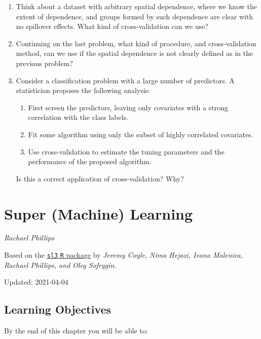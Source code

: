\documentclass[12pt, krantz2,]{book}
\providecommand{\tightlist}{%
  \setlength{\itemsep}{0pt}\setlength{\parskip}{0pt}}
\theoremstyle{definition}
\theoremstyle{definition}
\theoremstyle{definition}
\newcommand{\1}{\mathbbm{1}}
\begin{document}
\begin{enumerate}
\def\labelenumi{\arabic{enumi}.}
\item
  Think about a dataset with arbitrary spatial dependence, where we know
  the extent of dependence, and groups formed by such dependence are clear
  with no spillover effects. What kind of cross-validation can we use?
\item
  Continuing on the last problem, what kind of procedure, and cross-validation
  method, can we use if the spatial dependence is not clearly defined as in the
  previous problem?
\item
  Consider a classification problem with a large number of predictors. A
  statistician proposes the following analysis:

  \begin{enumerate}
  \def\labelenumii{\alph{enumii}.}
  \tightlist
  \item
    First screen the predictors, leaving only covariates with a strong
    correlation with the class labels.
  \item
    Fit some algorithm using only the subset of highly correlated covariates.
  \item
    Use cross-validation to estimate the tuning parameters and the performance
    of the proposed algorithm.
  \end{enumerate}

  Is this a correct application of cross-validation? Why?
\end{enumerate}

\hypertarget{sl3}{%
\chapter{Super (Machine) Learning}\label{sl3}}

\emph{Rachael Phillips}

Based on the \href{https://github.com/tlverse/sl3}{\texttt{sl3} \texttt{R} package} by \emph{Jeremy
Coyle, Nima Hejazi, Ivana Malenica, Rachael Phillips, and Oleg Sofrygin}.

Updated: 2021-04-04

\hypertarget{learning-objectives-3}{%
\section*{Learning Objectives}\label{learning-objectives-3}}


By the end of this chapter you will be able to:
\end{document}
